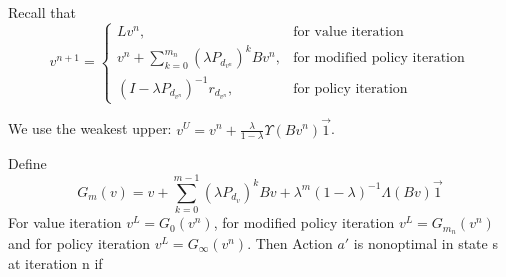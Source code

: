 Recall that
\[
    v^{n+1} = 
    \begin{cases}
        Lv^n, & \text{for value iteration} \\
        v^{n} + \sum^{m_n}_{k=0} {(\lambda P_{d_{v^n}})}^{k} B v^{n}, & \text{for modified policy iteration}\\
        {(I - \lambda P_{d_{v^n}})}^{-1} r_{d_{v^n}}, &\text{for policy iteration}
    \end{cases}
\]

We use the weakest upper: $ v^{U} = v^n + \frac{\lambda}{1 - \lambda} \Upsilon(B v^n) \vec{1} $.

Define
\[
    G_{m}(v) = v + \sum^{m-1}_{k=0} {(\lambda P_{d_v})}^{k} Bv + \lambda^{m}{(1 - \lambda)}^{-1} \Lambda(Bv) \vec{1}
\]
For value iteration $ v^L = G_0(v^{n}) $, for modified policy iteration $ v^L = G_{m_n}(v^n) $ and for policy iteration $ v^L = G_{\infty}(v^{n}) $.
Then Action $ a' $ is nonoptimal in state s at iteration n if

